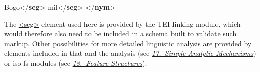 \begin{shaded}
\hspace*{1em}\hspace*{1em}\hspace*{1em}Bogo{</\textbf{seg}>}\mbox{}\newline 
\hspace*{1em}\hspace*{1em}\hspace*{1em}mil{</\textbf{seg}>}\mbox{}\newline 
\hspace*{1em}\hspace*{1em}\mbox{}\newline 
\hspace*{1em}\mbox{}\newline 
{}\mbox{}\newline 
{</\textbf{nym}>}\end{shaded}\egroup\par \noindent   The \hyperref[TEI.seg]{<seg>} element used here is provided by the TEI \textsf{linking} module, which would therefore also need to be included in a schema built to validate such markup. Other possibilities for more detailed linguistic analysis are provided by elements included in that and the \textsf{analysis} (see \textit{\hyperref[AI]{17.\ Simple Analytic Mechanisms}}) or \textsf{iso-fs} modules (see \textit{\hyperref[FS]{18.\ Feature Structures}}).\par
